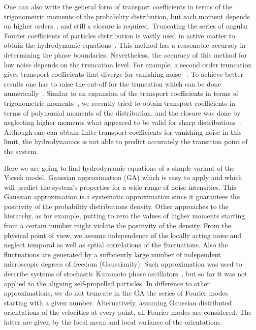 \documentclass[reprint,floatfix,amsmath,amssymb,aps,pre,showkeys,showpacs,superscriptaddress]{revtex4-1}
\newcommand{\hl}[1]{\textcolor{hlcolor}{#1}}
\begin{document}
One can also write the general form of transport coefficients in terms of the trigonometric moments of the \hl{probability} distribution, but each moment depends on higher orders~\cite{romanczuk2012swarming,romanczuk2012mean,Grossmann2012}, and still a closure is required. Truncating the \hl{series of} angular Fourier coefficients of particles distribution is vastly used in active matter to obtain \hl{the hydrodynamic equations}~\cite{Farrell2012,Grossmann2014,Yang2015,allaei2016}. This method has a reasonable accuracy in determining the phase boundaries. Nevertheless, the accuracy of this method for low noise depends on the truncation level. For example, a second order truncation gives transport coefficients that diverge \hl{for vanishing noise }~\cite{Farrell2012,allaei2016,Yang2015}. To achieve better results one has to raise the cut-off for the truncation which can be done numerically~\cite{Grossmann2013}. Similar to \hl{an} expansion of the transport coefficients in terms of trigonometric moments~\cite{romanczuk2012swarming,romanczuk2012mean,Grossmann2012}, we recently tried to obtain transport coefficients in terms of polynomial moments of the distribution, and the closure \hl{was} done by neglecting higher moments \hl{what appeared to be} valid for sharp distributions~\cite{allaei2016}. Although one can obtain finite transport coefficients \hl{for vanishing} noise in this limit, the hydrodynamics is not able to predict \hl{accurately} the transition point of the system.

Here we are going to find \hl{hydrodynamic equations} \hl{of a simple variant of the Vicsek model,}  Gaussian approximation (GA) which is easy to apply and \hl{which will predict the system's properties for a wide range of noise intensities.} \hl{This Gaussian approximation is a systematic approximation since it guarantees the positivity of the probability distributions density. Other approaches to  the hierarchy,  as for example, putting to zero the values of higher moments starting from a certain number might violate the positivity of the density. From the physical point of view, we assume independence of the locally acting noise and neglect temporal as well as sptial correlations of the fluctuations. Also the fluctuations are generated by a sufficiently large number of independent microscopic degrees of freedom (Gaussianity).} Such approximation was used to describe systems of stochastic Kuramoto phase oscillators~\cite{sonnenschein2013approximate,sonnenschein2013excitable,sonnenschein2014cooperative,Sonnenschein2015}, but so far  it  was not applied to the aligning self-propelled particles. In difference to other approximations\hl{,} we do not truncate in the GA the series of Fourier modes starting with a given number. Alternatively, assuming Gaussian distributed orientations of the velocities at every point, all Fourier modes are \hl{considered. The latter are} given by the local mean and local variance of the orientations.
\end{document}
